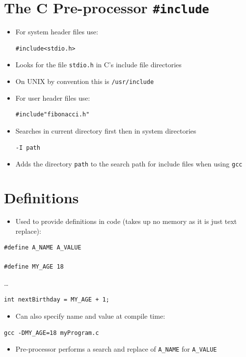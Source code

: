 \documentclass{article}
\begin{document}
\section{The C Pre-processor \texttt{\#include}}
\begin{itemize}
\item For system header files use:
\begin{Verbatim}
#include<stdio.h>
\end{Verbatim}
\item Looks for the file \verb!stdio.h! in C's include file directories
\item On UNIX by convention this is \verb!/usr/include!
\item For user header files use:
\begin{Verbatim}
#include"fibonacci.h"
\end{Verbatim}
\item Searches in current directory first then in system directories
\begin{Verbatim}
-I path
\end{Verbatim}
\item Adds the directory \verb!path! to the search path for include files when using \verb!gcc!
\end{itemize}



\section{Definitions}
\begin{itemize}
\item Used to provide definitions in code (takes up no memory as it is just text replace):
\end{itemize}
\begin{verbatim}
#define A_NAME A_VALUE

#define MY_AGE 18
\end{verbatim}
\ldots
\begin{verbatim}
int nextBirthday = MY_AGE + 1;
\end{verbatim}

\begin{itemize}
\item Can also specify name and value at compile time:
\end{itemize}
\begin{Verbatim}
gcc -DMY_AGE=18 myProgram.c
\end{Verbatim}

\begin{itemize}
\item Pre-processor performs a search and replace of \verb!A_NAME! for \verb!A_VALUE!
\end{itemize}
\end{document}
